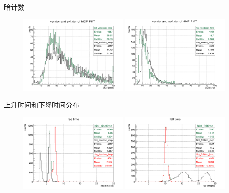 \documentclass[11pt,compress,xcolor=x11names,UTF8]{beamer}
\begin{document}
\begin{frame}{暗计数}
\begin{figure}
\centering
\includegraphics[width=0.48\textwidth]{vendordcr_mcp}
\includegraphics[width=0.48\textwidth]{vendordcr_hmp}
\end{figure}
\end{frame}
\begin{frame}{上升时间和下降时间分布}
\begin{figure}
\centering
\includegraphics[width=0.48\textwidth]{risetime}
\includegraphics[width=0.48\textwidth]{falltime}
\end{figure}
\end{frame}
\end{document}
